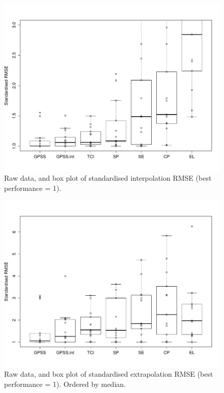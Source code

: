 \documentclass{article}
\begin{document}
\begin{figure}[h]
\centering
\includegraphics[width=\columnwidth]{figures/box_interp_dist}
\caption{
Raw data, and box plot of standardised interpolation RMSE (best performance = 1).
}
\label{fig:box_interp_dist}
\end{figure}

\begin{figure}[h]
\centering
\includegraphics[width=\columnwidth]{figures/box_extrap_dist}
\caption{
Raw data, and box plot of standardised extrapolation RMSE (best performance = 1).
Ordered by median.
}
\label{fig:box_extrap_dist}
\end{figure}
\end{document}
